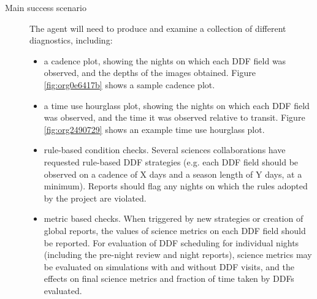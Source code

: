 \begin{description}
\item[{Main success scenario}] The agent will need to produce and examine a collection of different diagnostics, including:
\begin{itemize}
\item a cadence plot, showing the nights on which each DDF field was observed, and the depths of the images obtained. Figure \ref{fig:org0e6417b} shows a sample cadence plot.
\item a time use hourglass plot, showing the nights on which each DDF field was observed, and the time it was observed relative to transit. Figure \ref{fig:org2490729} shows an example time use hourglass plot.
\item rule-based condition checks. Several sciences collaborations have requested rule-based DDF strategies (e.g. each DDF field should be observed on a cadence of X days and a season length of Y days, at a minimum). Reports should flag any nights on which the rules adopted by the project are violated.
\item metric based checks. When triggered by new strategies or creation of global reports, the values of science metrics on each DDF field should be reported. For evaluation of DDF scheduling for individual nights (including the pre-night review and night reports), science metrics may be evaluated on simulations with and without DDF visits, and the effects on final science metrics and fraction of time taken by DDFs evaluated.
\end{itemize}
\end{description}
